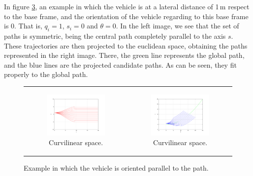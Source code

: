 In figure \ref{fig:cp07_frenet0}, an example in which the vehicle is at a lateral distance of 1\,m respect to the base frame, and the orientation of the vehicle regarding to this base frame is 0. That is, $q_i = 1$, $s_i = 0$ and $\theta = 0$. In the left image, we see that the set of paths is symmetric, being the central path completely parallel to the axis $s$. These trajectories are then projected to the euclidean space, obtaining the paths represented in the right image. There, the green line represents the global path, and the blue lines are the projected candidate paths. As can be seen, they fit properly to the global path.

\begin{figure}[h!]
\begin{tabular}{cc}
  \begin{subfigure}[b]{0.5\textwidth}
    \centering
    \includegraphics[width=\textwidth, trim=50 40 80 60,clip]{frenet0}
    \caption{Curvilinear space.}
    \label{fig:cp07_frenet0}
  \end{subfigure} &
  \begin{subfigure}[b]{0.5\textwidth}
    \centering
    \includegraphics[width=\textwidth, trim=50 40 80 60,clip]{cartesian0}
    \caption{Curvilinear space.}
    \label{fig:cp07_cartesian0}
  \end{subfigure}%
\end{tabular}
\caption{Example in which the vehicle is oriented parallel to the path.}\label{fig:cp07_frenet0}
\end{figure}

